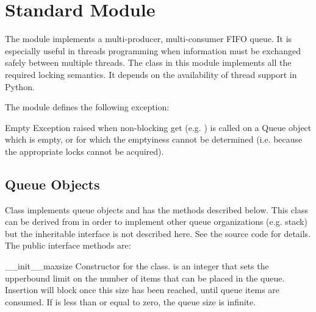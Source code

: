 \section{Standard Module }

\label{module-Queue}


The  module implements a multi-producer, multi-consumer
FIFO queue.  It is especially useful in threads programming when
information must be exchanged safely between multiple threads.  The
 class in this module implements all the required locking
semantics.  It depends on the availability of thread support in
Python.

The  module defines the following exception:


\begin{excdesc}{Empty}
Exception raised when non-blocking get (e.g. ) is
called on a Queue object which is empty, or for which the emptyiness
cannot be determined (i.e. because the appropriate locks cannot be
acquired).
\end{excdesc}

\subsection{Queue Objects}

Class  implements queue objects and has the methods
described below.  This class can be derived from in order to implement
other queue organizations (e.g. stack) but the inheritable interface
is not described here.  See the source code for details.  The public
interface methods are:


\begin{funcdesc}{__init__}{maxsize}
Constructor for the class.   is an integer that sets the
upperbound limit on the number of items that can be placed in the
queue.  Insertion will block once this size has been reached, until
queue items are consumed.  If  is less than or equal to
zero, the queue size is infinite.
\end{funcdesc}


